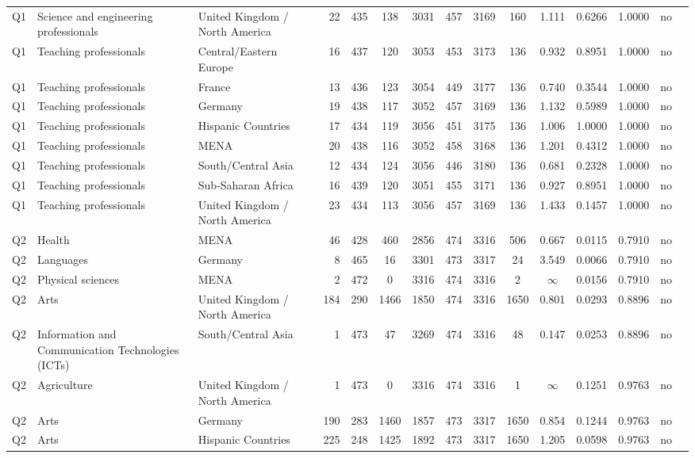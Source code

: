 \begin{longtable}{lllrcccccccccll}
Q1 & Science and engineering professionals & United Kingdom / North America & 22 & 435 & 138 & 3031 & 457 & 3169 & 160 & 1.111 & 0.6266 & 1.0000 & no \\
Q1 & Teaching professionals & Central/Eastern Europe & 16 & 437 & 120 & 3053 & 453 & 3173 & 136 & 0.932 & 0.8951 & 1.0000 & no \\
Q1 & Teaching professionals & France & 13 & 436 & 123 & 3054 & 449 & 3177 & 136 & 0.740 & 0.3544 & 1.0000 & no \\
Q1 & Teaching professionals & Germany & 19 & 438 & 117 & 3052 & 457 & 3169 & 136 & 1.132 & 0.5989 & 1.0000 & no \\
Q1 & Teaching professionals & Hispanic Countries & 17 & 434 & 119 & 3056 & 451 & 3175 & 136 & 1.006 & 1.0000 & 1.0000 & no \\
Q1 & Teaching professionals & MENA & 20 & 438 & 116 & 3052 & 458 & 3168 & 136 & 1.201 & 0.4312 & 1.0000 & no \\
Q1 & Teaching professionals & South/Central Asia & 12 & 434 & 124 & 3056 & 446 & 3180 & 136 & 0.681 & 0.2328 & 1.0000 & no \\
Q1 & Teaching professionals & Sub-Saharan Africa & 16 & 439 & 120 & 3051 & 455 & 3171 & 136 & 0.927 & 0.8951 & 1.0000 & no \\
Q1 & Teaching professionals & United Kingdom / North America & 23 & 434 & 113 & 3056 & 457 & 3169 & 136 & 1.433 & 0.1457 & 1.0000 & no \\
Q2 & Health & MENA & 46 & 428 & 460 & 2856 & 474 & 3316 & 506 & 0.667 & 0.0115 & 0.7910 & no \\
Q2 & Languages & Germany & 8 & 465 & 16 & 3301 & 473 & 3317 & 24 & 3.549 & 0.0066 & 0.7910 & no \\
Q2 & Physical sciences & MENA & 2 & 472 & 0 & 3316 & 474 & 3316 & 2 & $\infty$ & 0.0156 & 0.7910 & no \\
Q2 & Arts & United Kingdom / North America & 184 & 290 & 1466 & 1850 & 474 & 3316 & 1650 & 0.801 & 0.0293 & 0.8896 & no \\
Q2 & Information and Communication Technologies (ICTs) & South/Central Asia & 1 & 473 & 47 & 3269 & 474 & 3316 & 48 & 0.147 & 0.0253 & 0.8896 & no \\
Q2 & Agriculture & United Kingdom / North America & 1 & 473 & 0 & 3316 & 474 & 3316 & 1 & $\infty$ & 0.1251 & 0.9763 & no \\
Q2 & Arts & Germany & 190 & 283 & 1460 & 1857 & 473 & 3317 & 1650 & 0.854 & 0.1244 & 0.9763 & no \\
Q2 & Arts & Hispanic Countries & 225 & 248 & 1425 & 1892 & 473 & 3317 & 1650 & 1.205 & 0.0598 & 0.9763 & no \\

\end{longtable}
